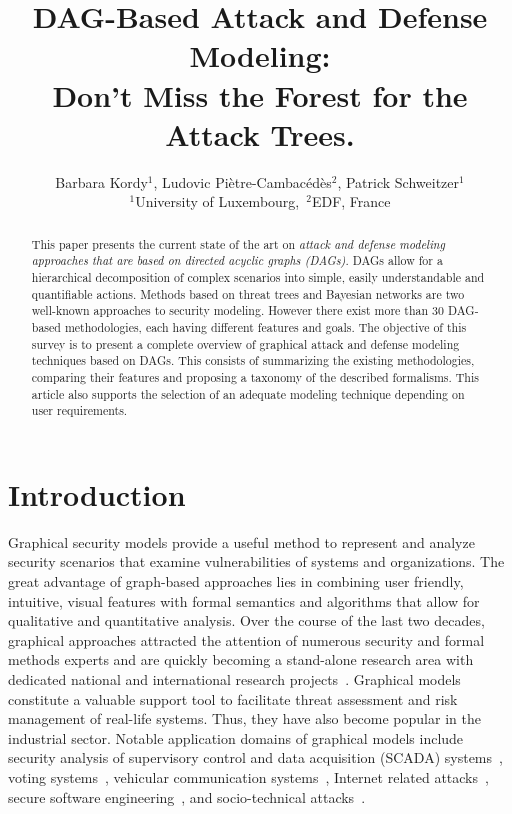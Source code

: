 \documentclass[a4paper]{article}
\author{
Barbara Kordy$^1$,
Ludovic Pi\`{e}tre-Cambac\'{e}d\`{e}s$^2$,
Patrick Schweitzer$^1$
\\
$^1$University of Luxembourg,~$^2$EDF, France
\date{}
}
\title{DAG-Based Attack and Defense Modeling:\\
Don't Miss the Forest for the Attack Trees.\footnotemark[1]}
\begin{document}
\maketitle

\begin{abstract}
This paper presents the current state of the art on \emph{attack and defense
modeling approaches that are based on directed acyclic graphs (DAGs)}. DAGs
allow for a hierarchical decomposition of complex scenarios into simple, easily
understandable and quantifiable actions. Methods based on threat trees and
Bayesian networks are two well-known approaches to security modeling. However
there exist more than $30$  DAG-based methodologies, each having different
features and goals. The objective of this survey is to present a complete
overview of  graphical attack and defense modeling techniques based on DAGs.
This consists  of summarizing the existing methodologies, comparing their
features  and proposing a taxonomy of the  described formalisms. This article
also  supports the selection of an adequate modeling technique depending on
user requirements. 
\end{abstract}

\renewcommand*{\thefootnote}{\fnsymbol{footnote}}
\renewcommand*{\thefootnote}{\arabic{footnote}}

\section{Introduction} 

Graphical security models provide a useful method to represent and analyze 
security scenarios that examine vulnerabilities of systems and organizations.
The great advantage of graph-based approaches lies in combining user friendly,
intuitive, visual  features with formal  semantics and algorithms that allow for
qualitative and quantitative analysis. Over the course of the last two decades,
graphical approaches attracted the attention of numerous security and formal
methods experts and are quickly becoming a stand-alone research area  with
dedicated national and international research 
projects~\cite{Website_SHIELDS,trespass,aniketos,ATREES,VISPER}. Graphical 
models constitute a valuable support tool to facilitate threat assessment and
risk management of real-life systems.  Thus, they have also become popular in
the industrial sector. Notable application domains of graphical models include
security analysis of supervisory control and data acquisition (SCADA)
systems~\cite{ByFrMi,TeLiGo,TaJo}, voting systems~\cite{LaDiEpHa,BuTr},
vehicular communication systems~\cite{HeApFuRoRuWe,AiBoDoFeGeKrLe}, Internet
related attacks~\cite{TiLaFiHa,LiZaRuLi}, secure software
engineering~\cite{JuElBaRa}, and socio-technical
attacks~\cite{BaKoMeSc,EoPaPaCh,ReVeOlCu}.
\end{document}
